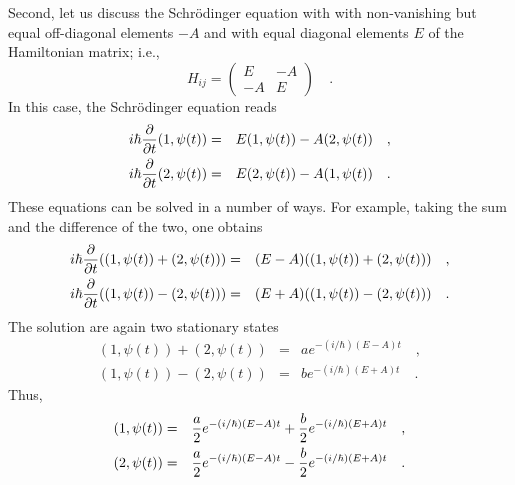 Second, let us discuss the Schr\"odinger equation with
with non-vanishing but equal off-diagonal elements $-A$
and with equal diagonal elements $E$
of the
Hamiltonian matrix; i.e.,
\begin{equation}
H_{ij} =\left( \begin{array}{cc} E  & -A\\
-A &E
 \end{array} \right)
 \quad .
\end{equation}
In this case, the Schr\"odinger equation
reads
\begin{eqnarray}
i\hbar {\partial \over \partial t} ( 1 , \psi (t)  )   &=&
E ( 1 , \psi (t) ) - A  ( 2 , \psi (t) )
\quad ,\\
i\hbar {\partial \over \partial t} ( 2 , \psi (t) )   &=&
E ( 2 , \psi (t) ) - A  ( 1 , \psi (t) )
\quad .
\end{eqnarray}
These equations can be solved in a number of ways. For example, taking
the sum and the difference of the two, one obtains
\begin{eqnarray}
i\hbar {\partial \over \partial t} (( 1 , \psi (t) ) +( 2
, \psi (t) ) )
&=&
(E-A) (( 1 , \psi (t) ) +  ( 2 , \psi (t) ))
\quad ,\\
i\hbar {\partial \over \partial t} (( 1 , \psi (t)  ) -( 2
, \psi  (t)) )
&=&
(E+A) (( 1 , \psi (t) ) -  ( 2 , \psi (t) ))
\quad .
\end{eqnarray}
The solution are again two stationary states
\begin{eqnarray}
( 1 , \psi (t) ) +( 2 , \psi (t) )
&=&
ae^{-(i/\hbar )(E-A)t}
\quad ,\\
( 1 , \psi  (t)) -( 2 , \psi  (t))
&=&
be^{-(i/\hbar )(E+A)t}
\quad .
\end{eqnarray}
Thus,
\begin{eqnarray}
( 1 , \psi  (t))
&=&
{a\over 2}e^{-(i/\hbar )(E-A)t}+
{b\over 2}e^{-(i/\hbar )(E+A)t}
\label{el:nh21}
\quad ,\\
( 2 , \psi  (t))
&=&
{a\over 2}e^{-(i/\hbar )(E-A)t}-
{b\over 2}e^{-(i/\hbar )(E+A)t}
\label{el:nh22}
\quad .
\end{eqnarray}

